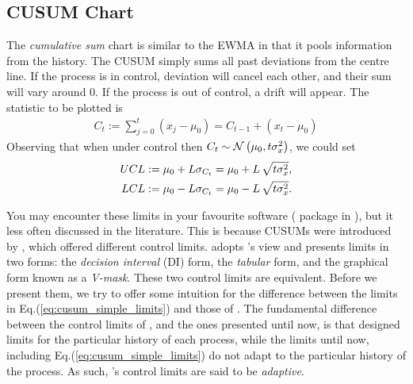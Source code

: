 \subsection[CUSUM]{CUSUM Chart}
The \emph{cumulative sum} chart is similar to the EWMA in that it pools information from the history. 
The CUSUM simply sums all past deviations from the centre line.
If the process is in control, deviation will cancel each other, and their sum will vary around $0$. 
If the process is out of control, a drift will appear. 
The statistic to be plotted is 
\begin{align}
	C_t:= \sum_{j=0}^{t}(x_j-\mu_0)=C_{t-1}+ (x_t-\mu_0)
\end{align} 
Observing that when under control then $C_t \sim \mathcal{N}\left(\mu_0, t \sigma_x^2\right)$, we could set 
\begin{align}
\label{eq:cusum_simple_limits}
\begin{split}
	UCL &:= \mu_0 + L \sigma_{C_t}= \mu_0 + L \, \sqrt{t \sigma_x^2},  \\
	LCL &:= \mu_0 - L \sigma_{C_t}= \mu_0 - L \, \sqrt{t \sigma_x^2}.
\end{split}
\end{align}

\begin{extra}
You may encounter these limits in your favourite software ( package in \R), but it less often discussed in the literature. 
This is because CUSUMs were introduced by \cite{page_continuous_1954}, which offered different control limits. 
\cite{montgomery_introduction_2007} adopts \citeauthor{page_continuous_1954}'s view and presents limits in two forms: the \emph{decision interval} (DI) form, \aka the \emph{tabular} form, and the graphical form known as a \emph{V-mask}.
These two control limits are equivalent. Before we present them, we try to offer some intuition for the difference between the limits in Eq.(\ref{eq:cusum_simple_limits}) and those of \cite{page_continuous_1954}.
The fundamental difference between the control limits of \cite{page_continuous_1954}, and the ones presented until now, is that \citeauthor{page_continuous_1954} designed limits for the particular history of each process, while the limits until now, including Eq.(\ref{eq:cusum_simple_limits}) do not adapt to the particular history of the process.
As such, \citeauthor{page_continuous_1954}'s control limits are said to be \emph{adaptive}.
\end{extra}






